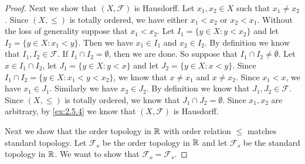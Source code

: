 \begin{proof}
  Next we show that \((X, \mathcal{F})\) is Hausdorff.
  Let \(x_1, x_2 \in X\) such that \(x_1 \neq x_2\).
  Since \((X, \leq)\) is totally ordered, we have either \(x_1 < x_2\) or \(x_2 < x_1\).
  Without the loss of generality suppose that \(x_1 < x_2\).
  Let \(I_1 = \{y \in X : y < x_2\}\) and let \(I_2 = \{y \in X : x_1 < y\}\).
  Then we have \(x_1 \in I_1\) and \(x_2 \in I_2\).
  By definition we know that \(I_1, I_2 \in \mathcal{F}\).
  If \(I_1 \cap I_2 = \emptyset\), then we are done.
  So suppose that \(I_1 \cap I_2 \neq \emptyset\).
  Let \(x \in I_1 \cap I_2\), let \(J_1 = \{y \in X : y < x\}\) and let \(J_2 = \{y \in X : x < y\}\).
  Since \(I_1 \cap I_2 = \{y \in X : x_1 < y < x_2\}\), we know that \(x \neq x_1\) and \(x \neq x_2\).
  Since \(x_1 < x\), we have \(x_1 \in J_1\).
  Similarly we have \(x_2 \in J_2\).
  By definition we know that \(J_1, J_2 \in \mathcal{F}\).
  Since \((X, \leq)\) is totally ordered, we know that \(J_1 \cap J_2 = \emptyset\).
  Since \(x_1, x_2\) are arbitrary, by \cref{ex:2.5.4} we know that \((X, \mathcal{F})\) is Hausdorff.

  Next we show that the order topology in \(\mathbb{R}\) with order relation \(\leq\) matches standard topology.
  Let \(\mathcal{F}_o\) be the order topology in \(\mathbb{R}\) and let \(\mathcal{F}_s\) be the standard topology in \(\mathbb{R}\).
  We want to show that \(\mathcal{F}_o = \mathcal{F}_s\).


\end{proof}
